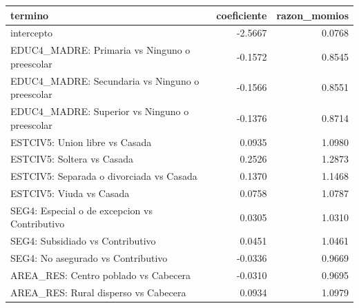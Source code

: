 \begin{tabular}{lrr}
\toprule
termino & coeficiente & razon\_momios \\
\midrule
intercepto & -2.5667 & 0.0768 \\
EDUC4\_MADRE: Primaria vs Ninguno o preescolar & -0.1572 & 0.8545 \\
EDUC4\_MADRE: Secundaria vs Ninguno o preescolar & -0.1566 & 0.8551 \\
EDUC4\_MADRE: Superior vs Ninguno o preescolar & -0.1376 & 0.8714 \\
ESTCIV5: Union libre vs Casada & 0.0935 & 1.0980 \\
ESTCIV5: Soltera vs Casada & 0.2526 & 1.2873 \\
ESTCIV5: Separada o divorciada vs Casada & 0.1370 & 1.1468 \\
ESTCIV5: Viuda vs Casada & 0.0758 & 1.0787 \\
SEG4: Especial o de excepcion vs Contributivo & 0.0305 & 1.0310 \\
SEG4: Subsidiado vs Contributivo & 0.0451 & 1.0461 \\
SEG4: No asegurado vs Contributivo & -0.0336 & 0.9669 \\
AREA\_RES: Centro poblado vs Cabecera & -0.0310 & 0.9695 \\
AREA\_RES: Rural disperso vs Cabecera & 0.0934 & 1.0979 \\
\bottomrule
\end{tabular}
